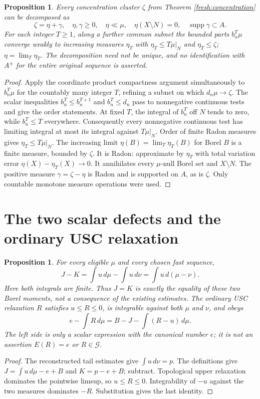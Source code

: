\documentclass[11pt]{article}
\newtheorem{proposition}[theorem]{Proposition}
\begin{document}
\begin{proposition}\label{fresh:cluster-split}
Every concentration cluster $\zeta$ from
Theorem \ref{fresh:concentration} can be decomposed as
\[
 \zeta=\eta+\gamma,\quad \eta,\gamma\ge0,
 \quad \eta\ll\mu,\quad\eta(X\setminus N)=0,
 \quad\operatorname{supp}\gamma\subset A.
\]
For each integer $T\ge1$, along a further common subnet the bounded
parts $b_n^T\mu$ converge weakly to increasing measures $\eta_T$ with
$\eta_T\le T\mu|_N$ and $\eta_T\le\zeta$; $\eta=\lim_T\eta_T$.
The decomposition need not be unique, and no identification with
$A^\pm$ for the entire original sequence is asserted.
\end{proposition}
\begin{proof}
Apply the coordinate product compactness argument simultaneously to
$b_n^T\mu$ for the countably many integer $T$, refining a subnet on
which $d_n\mu\to\zeta$. The scalar inequalities $b_n^T\le b_n^{T+1}$
and $b_n^T\le d_n$ pass to nonnegative continuous tests and give the
order statements. At fixed $T$, the integral of $b_n^T$ off $N$ tends
to zero, while $b_n^T\le T$ everywhere. Consequently every
nonnegative continuous test has limiting integral at most its integral
against $T\mu|_N$. Order of finite Radon measures gives
$\eta_T\le T\mu|_N$.
The increasing limit $\eta(B)=\lim_T\eta_T(B)$ for Borel $B$ is a
finite measure, bounded by $\zeta$. It is Radon: approximate by
$\eta_T$ with total variation error
$\eta(X)-\eta_T(X)\to0$. It annihilates every $\mu$-null Borel set
and $X\setminus N$. The positive measure $\gamma=\zeta-\eta$ is
Radon and is supported on $A$, as is $\zeta$. Only countable
monotone measure operations were used.
\end{proof}

\section{The two scalar defects and the ordinary USC relaxation}
\begin{proposition}\label{fresh:JK}
For every eligible $\mu$ and every chosen fast sequence,
\[
 J-K=\int u\,d\mu-\int u\,d\nu=\int u\,d(\mu-\nu).
\]
Here both integrals are finite. Thus $J=K$ is exactly the equality of
these two Borel moments, not a consequence of the existing estimates.
The ordinary USC relaxation $R$ satisfies $u\le R\le0$, is
integrable against both $\mu$ and $\nu$, and obeys
\[
 e-\int R\,d\mu=B-J-\int(R-u)\,d\mu.
\]
The left side is only a scalar expression with the canonical number
$e$; it is not an assertion $E(R)=e$ or $R\in\mathcal G$.
\end{proposition}
\begin{proof}
The reconstructed tail estimates give $\int u\,d\nu=p$. The
definitions give $J=\int u\,d\mu-e+B$ and $K=p-e+B$; subtract.
Topological upper relaxation dominates the pointwise limsup, so
$u\le R\le0$. Integrability of $-u$ against the two measures
dominates $-R$. Substitution gives the last identity.
\end{proof}
\end{document}
